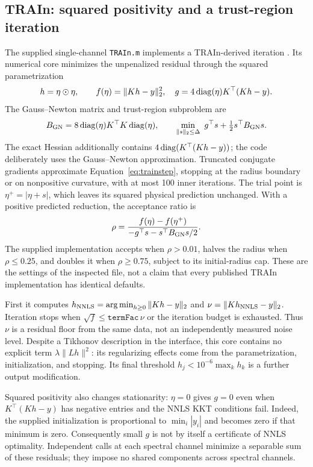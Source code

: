 \subsection{TRAIn: squared positivity and a trust-region iteration}\label{sec:trainmath}
The supplied single-channel \texttt{TRAIn.m} implements a TRAIn-derived iteration \cite{train}. Its numerical core minimizes the unpenalized residual through the squared parametrization
\begin{equation}\label{eq:trainobjective}
 h=\eta\odot\eta,\qquad f(\eta)=\|Kh-y\|_2^2,
 \quad g=4\operatorname{diag}(\eta)K^\top(Kh-y).
\end{equation}
The Gauss--Newton matrix and trust-region subproblem are
\begin{equation}\label{eq:trainstep}
 B_{\rm GN}=8\operatorname{diag}(\eta)K^\top K\operatorname{diag}(\eta),\qquad
 \min_{\|s\|_2\leq\Delta}\ g^\top s+\tfrac12s^\top B_{\rm GN}s.
\end{equation}
The exact Hessian additionally contains $4\operatorname{diag}(K^\top(Kh-y))$; the code deliberately uses the Gauss--Newton approximation. Truncated conjugate gradients approximate Equation~\eqref{eq:trainstep}, stopping at the radius boundary or on nonpositive curvature, with at most 100 inner iterations. The trial point is $\eta^+=|\eta+s|$, which leaves its squared physical prediction unchanged. With a positive predicted reduction, the acceptance ratio is
\begin{equation}\label{eq:trainratio}
 \rho=\frac{f(\eta)-f(\eta^+)}{-g^\top s-s^\top B_{\rm GN}s/2}.
\end{equation}
The supplied implementation accepts when $\rho>0.01$, halves the radius when $\rho\leq0.25$, and doubles it when $\rho\geq0.75$, subject to its initial-radius cap. These are the settings of the inspected file, not a claim that every published TRAIn implementation has identical defaults.

First it computes $h_{\rm NNLS}=\operatorname*{arg\,min}_{h\geq0}\|Kh-y\|_2$ and $\nu=\|Kh_{\rm NNLS}-y\|_2$. Iteration stops when $\sqrt{f}\leq\mathtt{termFac}\,\nu$ or the iteration budget is exhausted. Thus $\nu$ is a residual floor from the same data, not an independently measured noise level. Despite a Tikhonov description in the interface, this core contains no explicit term $\lambda\|Lh\|^2$: its regularizing effects come from the parametrization, initialization, and stopping. Its final threshold $h_j<10^{-6}\max_kh_k$ is a further output modification.

Squared positivity also changes stationarity: $\eta=0$ gives $g=0$ even when $K^\top(Kh-y)$ has negative entries and the NNLS KKT conditions fail. Indeed, the supplied initialization is proportional to $\min_i|y_i|$ and becomes zero if that minimum is zero. Consequently small $g$ is not by itself a certificate of NNLS optimality. Independent calls at each spectral channel minimize a separable sum of these residuals; they impose no shared components across spectral channels.

